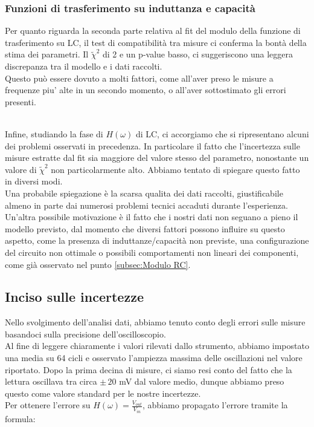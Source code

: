 \documentclass[letterpaper,12pt]{article}
\begin{document}
\subsubsection{Funzioni di trasferimento su induttanza e capacità}
Per quanto riguarda la seconda parte relativa al fit del modulo della funzione di trasferimento su LC, il test di compatibilità tra misure ci conferma la bontà della stima dei parametri. Il $\widetilde\chi^2$ di 2 e un p-value basso, ci suggeriscono una leggera discrepanza tra il modello e i dati raccolti. \\
Questo può essere dovuto a molti fattori, come all'aver preso le misure a frequenze piu' alte in un secondo momento, o all'aver sottostimato gli errori presenti.

\\
Infine, studiando la fase di $H(\omega)$ di LC, ci accorgiamo che si ripresentano alcuni dei problemi osservati in precedenza. In particolare il fatto che l'incertezza sulle misure estratte dal fit sia maggiore del valore stesso del parametro, nonostante un valore di $\widetilde\chi^2$ non particolarmente alto. Abbiamo tentato di spiegare questo fatto in diversi modi.\\
Una probabile spiegazione è la scarsa qualita dei dati raccolti, giustificabile almeno in parte dai numerosi problemi tecnici accaduti durante l'esperienza. Un'altra possibile motivazione è il fatto che i nostri dati non seguano a pieno il modello previsto, dal momento che diversi fattori possono influire su questo aspetto, come la presenza di induttanze/capacità non previste, una configurazione del circuito non ottimale o possibili comportamenti non lineari dei componenti, come già osservato nel punto \ref{subsec:Modulo RC}.

\subsection{Inciso sulle incertezze} \label{sec:incertezze}
Nello svolgimento dell'analisi dati, abbiamo tenuto conto degli errori sulle misure basandoci sulla precisione dell'oscilloscopio.\\
Al fine di leggere chiaramente i valori rilevati dallo strumento, abbiamo impostato una media su 64 cicli e osservato l'ampiezza massima delle oscillazioni nel valore riportato. Dopo la prima decina di misure, ci siamo resi conto del fatto che la lettura oscillava tra circa $\pm\, 20$ mV dal valore medio, dunque abbiamo preso questo come valore standard per le nostre incertezze.\\
Per ottenere l'errore su $H(\omega) = \frac{V_{out}}{V_{in}}$, abbiamo propagato l'errore tramite la formula:
\end{document}

